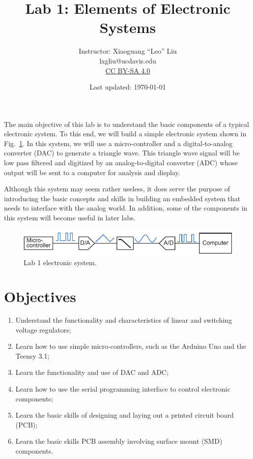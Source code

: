 \documentclass[letterpaper, 11pt]{article}
\begin{document}
\title{Lab 1: Elements of Electronic Systems}
\author{Instructor: Xiaoguang ``Leo'' Liu\\lxgliu@ucdavis.edu \\
	\small \href{http://creativecommons.org/licenses/by-sa/4.0/}{CC BY-SA 4.0}}
\date{Last updated: \today}

\maketitle

The main objective of this lab is to understand the basic components of a typical electronic system. To this end, we will build a simple electronic system shown in Fig.~\ref{fig:lab1-system}. In this system, we will use a micro-controller and a digital-to-analog converter (DAC) to generate a triangle wave. This triangle wave signal will be low pass filtered and digitized by an analog-to-digital converter (ADC) whose output will be sent to a computer for analysis and display.

Although this system may seem rather useless, it does serve the purpose of introducing the basic concepts and skills in building an embedded system that needs to interface with the analog world. In addition, some of the components in this system will become useful in later labs. 

\begin{figure}[h]
	\centering
	\includegraphics{lab1-system}
	\caption{Lab 1 electronic system.}
	\label{fig:lab1-system}
\end{figure}

\section{Objectives}

\begin{enumerate}[itemsep=0.1ex]
	\item Understand the functionality and characteristics of linear and switching voltage regulators;
	\item Learn how to use simple micro-controllers, such as the Arduino Uno and the Teensy 3.1;
	\item Learn the functionality and use of DAC and ADC;
	\item Learn how to use the serial programming interface to control electronic components;
	\item Learn the basic skills of designing and laying out a printed circuit board (PCB);
	\item Learn the basic skills PCB assembly involving surface mount (SMD) components.
\end{enumerate}
\end{document}
